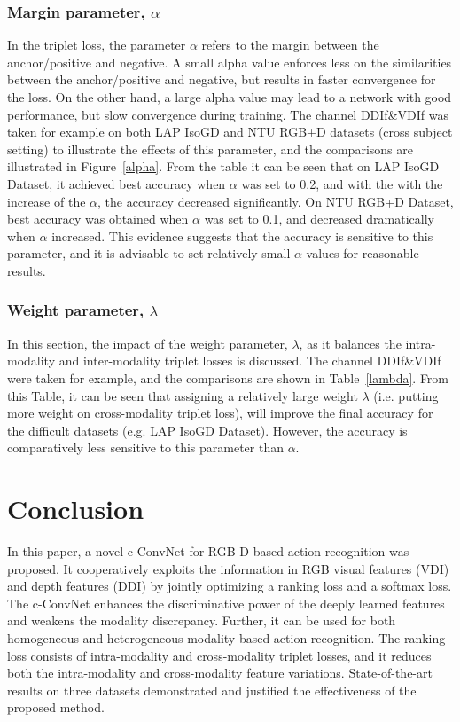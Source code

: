 \documentclass[letterpaper]{article} %
\begin{document}
\subsubsection{Margin parameter, $\alpha$}
In the triplet loss, the parameter $\alpha$ refers to the
margin between the anchor/positive and negative. A small alpha
value enforces less on the similarities between the anchor/positive and
negative, but results in faster convergence for the loss.
On the other hand, a large alpha value may lead to a network with good
performance, but slow convergence during training.
The channel DDIf\&VDIf was taken for example on both LAP IsoGD and NTU RGB+D
datasets (cross subject setting) to illustrate the effects of this parameter,
and the comparisons are illustrated in Figure~\ref{alpha}. From the table it can be
seen that on LAP IsoGD Dataset, it achieved best accuracy when $\alpha$ was set
to 0.2, and with the with the increase of the $\alpha$, the accuracy
decreased significantly. On NTU RGB+D Dataset, best accuracy was obtained when
$\alpha$ was set to 0.1, and decreased dramatically when $\alpha$ increased.
This evidence suggests that the accuracy is sensitive to this
parameter, and it is advisable to set relatively small $\alpha$ values for
reasonable results.


\subsubsection{Weight parameter, $\lambda$}
In this section, the impact of the weight parameter, $\lambda$, as it
balances the intra-modality and inter-modality triplet losses is discussed. The
channel  DDIf\&VDIf were taken for example, and  the comparisons are shown in
Table~\ref{lambda}. From this Table, it can be seen that assigning a relatively
large weight $\lambda$ (i.e. putting more weight on cross-modality
triplet loss), will improve the final accuracy for the difficult datasets
(e.g. LAP IsoGD Dataset). However, the accuracy is comparatively less
sensitive to this parameter than $\alpha$.


\section{Conclusion}\label{conclusion}
In this paper, a novel c-ConvNet for RGB-D based action recognition was
proposed. It cooperatively exploits the information in RGB visual features
(VDI) and depth features (DDI) by
jointly optimizing a ranking loss and a softmax loss. The c-ConvNet enhances
the discriminative power of the deeply learned features and weakens the
modality discrepancy. Further, it can be used for both homogeneous and
heterogeneous modality-based action recognition. The ranking loss consists of
intra-modality and cross-modality triplet losses, and it reduces both the
intra-modality and cross-modality feature variations. State-of-the-art results
on three datasets demonstrated and justified the effectiveness of the proposed
method.
\end{document}
